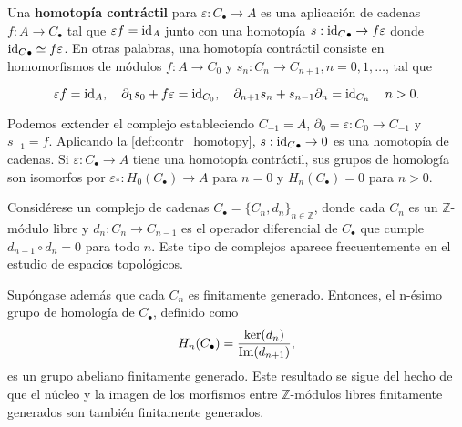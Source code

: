 \begin{definicion}
\label{def:contr_homotopy}
Una \textbf{homotopía contráctil} para \( \varepsilon: C_{\bullet} \to A \) es una aplicación de cadenas \( f: A \to C_{\bullet} \) tal que \( \varepsilon f = \operatorname{id}_A \) junto con una homotopía \( s: {\operatorname{id}_C}_{\bullet} \rightarrow f \varepsilon \) donde \( {\operatorname{id}_C}_{\bullet} \simeq f \varepsilon \). En otras palabras, una homotopía contráctil consiste en homomorfismos de módulos \( f: A \to C_0 \) y \( s_n: C_n \to C_{n+1}, n = 0, 1, \dots \), tal que

\[ \varepsilon f = \operatorname{id}_A, \quad \partial_{1} s_0 + f \varepsilon = \operatorname{id}_{C_0}, \quad \partial_{n+1} s_n + s_{n-1} \partial_n = \operatorname{id}_{C_n} \quad n > 0. \]
\end{definicion}

Podemos extender el complejo estableciendo \( C_{-1} = A \), \( \partial_0 = \varepsilon: C_0 \to C_{-1} \) y \( s_{-1} = f \). Aplicando la \autoref{def:contr_homotopy}, \( s: {\operatorname{id}_C}_{\bullet} \rightarrow 0 \) es una homotopía de cadenas. Si \( \varepsilon: C_{\bullet} \to A \) tiene una homotopía contráctil, sus grupos de homología son isomorfos por \( \varepsilon_*: H_0(C_{\bullet}) \rightarrow A \) para \( n = 0 \) y \( H_n(C_{\bullet}) = 0 \) para \( n > 0 \).

Considérese un complejo de cadenas \( C_{\bullet} = \{ C_n, d_n \}_{n \in \mathbb{Z}} \), donde cada \( C_n \) es un \( \mathbb{Z} \)-módulo libre y \( d_n: C_n \to C_{n-1} \) es el operador diferencial de \( C_{\bullet} \) que cumple \( d_{n-1} \circ d_n = 0 \) para todo \( n \). Este tipo de complejos aparece frecuentemente en el estudio de espacios topológicos.

Supóngase además que cada \( C_n \) es finitamente generado. Entonces, el n-ésimo grupo de homología de \( C_{\bullet} \), definido como
\[ H_n(C_{\bullet}) = \frac{\ker(d_n)}{\operatorname{Im}(d_{n+1})}, \]
es un grupo abeliano finitamente generado. Este resultado se sigue del hecho de que el núcleo y la imagen de los morfismos entre \( \mathbb{Z} \)-módulos libres finitamente generados son también finitamente generados.

